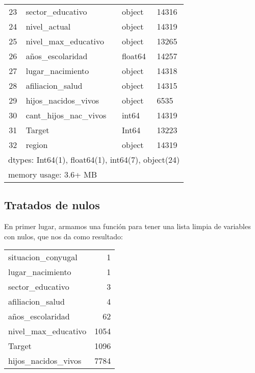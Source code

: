 \documentclass[a4paper]{article}
\begin{document}
\begin{table}[H]
\begin{tabular}{clll}
            23  & sector\_educativo & object & 14316 \\ 
            24  & nivel\_actual & object & 14319 \\ 
            25  & nivel\_max\_educativo & object & 13265 \\ 
            26  & años\_escolaridad & float64 & 14257 \\ 
            27  & lugar\_nacimiento & object & 14318 \\ 
            28  & afiliacion\_salud & object & 14315 \\ 
            29  & hijos\_nacidos\_vivos & object & 6535 \\ 
            30  & cant\_hijos\_nac\_vivos & int64 & 14319 \\ 
            31  & Target & Int64 & 13223 \\ 
            32  & region & object & 14319 \\
            \multicolumn{4}{l}{dtypes: Int64(1), float64(1), int64(7), object(24)} \\
            \multicolumn{4}{l}{memory usage: 3.6+ MB } \\
        \end{tabular}
    \end{table}

    \subsection{Tratados de nulos}

        En primer lugar, armamos una función para tener una lista limpia de variables con nulos, que nos da como resultado:

        \begin{table}[H]
            \begin{tabular}{lr}
                situacion\_conyugal & 1 \\ 
                lugar\_nacimiento & 1 \\ 
                sector\_educativo & 3 \\ 
                afiliacion\_salud & 4 \\ 
                años\_escolaridad & 62 \\ 
                nivel\_max\_educativo & 1054 \\ 
                Target & 1096 \\ 
                hijos\_nacidos\_vivos & 7784 \\ 
            \end{tabular}
        \end{table}
\end{document}
